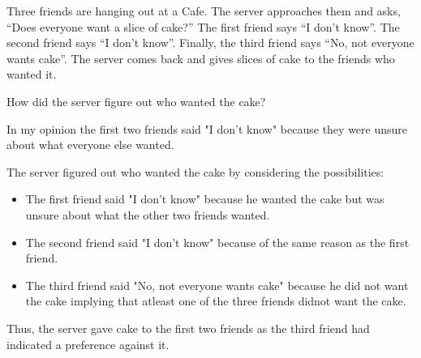 \documentclass[a4paper]{exam}
\begin{document}
\begin{questions}
  
  \question Three friends are hanging out at a Cafe. The server approaches them and asks, ``Does everyone want a slice of cake?'' The first friend says ``I don’t know''. The second friend says ``I don’t know''. Finally, the third friend says ``No, not everyone wants cake''. The server comes back and gives slices of cake to the friends who wanted it. 

  How did the server figure out who wanted the cake?
  \begin{solution}
    
    In my opinion the first two friends said "I don't know" because they were unsure about what everyone else wanted.
    
    The server figured out who wanted the cake by considering the possibilities:
    \begin{itemize}
      \item The first friend said "I don't know" because he wanted the cake but was unsure about what the other two friends wanted.
      \item The second friend said "I don't know" because of the same reason as the first friend.
      \item The third friend said "No, not everyone wants cake" because he did not want the cake implying that atleast one of the three friends didnot want the cake.
    \end{itemize}
    Thus, the server gave cake to the first two friends as the third friend had indicated a preference against it.
  \end{solution}
  

\end{questions}
\end{document}
